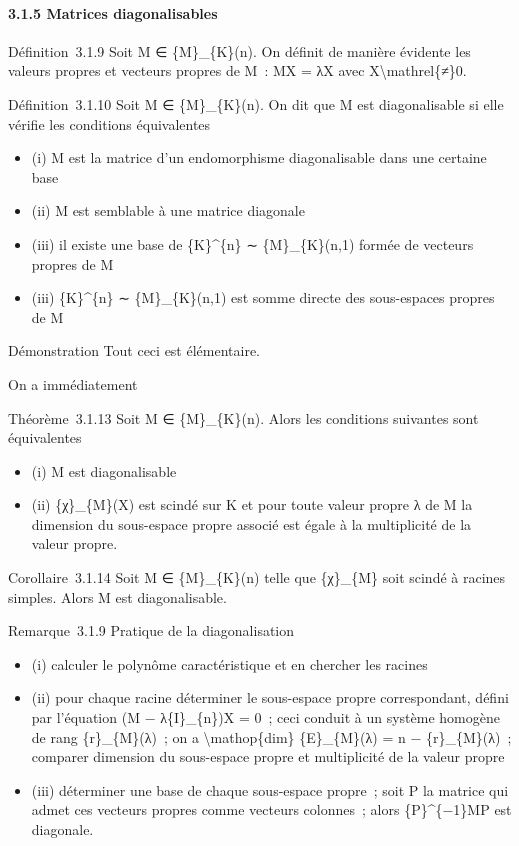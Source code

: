 \documentclass[]{article}
\begin{document}
\paragraph{3.1.5 Matrices diagonalisables}

Définition~3.1.9 Soit M ∈ \{M\}\_\{K\}(n). On définit de manière
évidente les valeurs propres et vecteurs propres de M~: MX = λX avec
X\textbackslash{}mathrel\{≠\}0.

Définition~3.1.10 Soit M ∈ \{M\}\_\{K\}(n). On dit que M est
diagonalisable si elle vérifie les conditions équivalentes

\begin{itemize}
\itemsep1pt\parskip0pt
\item
  (i) M est la matrice d'un endomorphisme diagonalisable dans une
  certaine base
\item
  (ii) M est semblable à une matrice diagonale
\item
  (iii) il existe une base de \{K\}\^{}\{n\} ∼ \{M\}\_\{K\}(n,1) formée
  de vecteurs propres de M
\item
  (iii) \{K\}\^{}\{n\} ∼ \{M\}\_\{K\}(n,1) est somme directe des
  sous-espaces propres de M
\end{itemize}

Démonstration Tout ceci est élémentaire.

On a immédiatement

Théorème~3.1.13 Soit M ∈ \{M\}\_\{K\}(n). Alors les conditions suivantes
sont équivalentes

\begin{itemize}
\itemsep1pt\parskip0pt
\item
  (i) M est diagonalisable
\item
  (ii) \{χ\}\_\{M\}(X) est scindé sur K et pour toute valeur propre λ de
  M la dimension du sous-espace propre associé est égale à la
  multiplicité de la valeur propre.
\end{itemize}

Corollaire~3.1.14 Soit M ∈ \{M\}\_\{K\}(n) telle que \{χ\}\_\{M\} soit
scindé à racines simples. Alors M est diagonalisable.

Remarque~3.1.9 Pratique de la diagonalisation

\begin{itemize}
\itemsep1pt\parskip0pt
\item
  (i) calculer le polynôme caractéristique et en chercher les racines
\item
  (ii) pour chaque racine déterminer le sous-espace propre
  correspondant, défini par l'équation (M − λ\{I\}\_\{n\})X = 0~; ceci
  conduit à un système homogène de rang \{r\}\_\{M\}(λ)~; on a
  \textbackslash{}mathop\{dim\} \{E\}\_\{M\}(λ) = n − \{r\}\_\{M\}(λ)~;
  comparer dimension du sous-espace propre et multiplicité de la valeur
  propre
\item
  (iii) déterminer une base de chaque sous-espace propre~; soit P la
  matrice qui admet ces vecteurs propres comme vecteurs colonnes~; alors
  \{P\}\^{}\{−1\}MP est diagonale.
\end{itemize}
\end{document}
